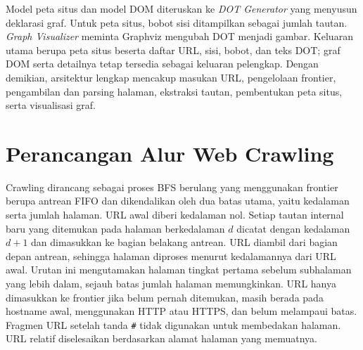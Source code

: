 Model peta situs dan model DOM diteruskan ke \textit{DOT Generator} yang menyusun deklarasi graf. Untuk peta situs, bobot sisi ditampilkan sebagai jumlah tautan. \textit{Graph Visualizer} meminta Graphviz mengubah DOT menjadi gambar. Keluaran utama berupa peta situs beserta daftar URL, sisi, bobot, dan teks DOT; graf DOM serta detailnya tetap tersedia sebagai keluaran pelengkap. Dengan demikian, arsitektur lengkap mencakup masukan URL, pengelolaan frontier, pengambilan dan parsing halaman, ekstraksi tautan, pembentukan peta situs, serta visualisasi graf.

\section{Perancangan Alur Web Crawling}
\label{sec:perancangan-alur-web-crawling}

Crawling dirancang sebagai proses BFS berulang yang menggunakan frontier berupa antrean FIFO dan dikendalikan oleh dua batas utama, yaitu kedalaman serta jumlah halaman. URL awal diberi kedalaman nol. Setiap tautan internal baru yang ditemukan pada halaman berkedalaman $d$ dicatat dengan kedalaman $d+1$ dan dimasukkan ke bagian belakang antrean. URL diambil dari bagian depan antrean, sehingga halaman diproses menurut kedalamannya dari URL awal. Urutan ini mengutamakan halaman tingkat pertama sebelum subhalaman yang lebih dalam, sejauh batas jumlah halaman memungkinkan. URL hanya dimasukkan ke frontier jika belum pernah ditemukan, masih berada pada hostname awal, menggunakan HTTP atau HTTPS, dan belum melampaui batas. Fragmen URL setelah tanda \texttt{\#} tidak digunakan untuk membedakan halaman. URL relatif diselesaikan berdasarkan alamat halaman yang memuatnya.

